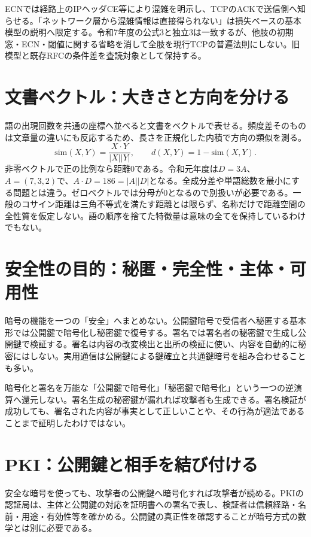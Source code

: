 ECNでは経路上のIPヘッダCE等により混雑を明示し、TCPのACKで送信側へ知らせる\cite{net_ecn2001}。「ネットワーク層から混雑情報は直接得られない」は損失ベースの基本模型の説明へ限定する。令和7年度の公式3と独立3は一致するが、他肢の初期窓・ECN・閾値に関する省略を消して全肢を現行TCPの普遍法則にしない。旧模型と既存RFCの条件差を査読対象として保持する。

\section{文書ベクトル：大きさと方向を分ける}
\label{theory:network:cosine}
語の出現回数を共通の座標へ並べると文書をベクトルで表せる。頻度差そのものは文章量の違いにも反応するため、長さを正規化した内積で方向の類似を測る\cite{net_cosine}。
\[
 \mathrm{sim}(X,Y)=\frac{X\cdot Y}{|X||Y|},\qquad
 d(X,Y)=1-\mathrm{sim}(X,Y).
\]
非零ベクトルで正の比例なら距離0である。令和元年度は$D=3A$、$A=(7,3,2)$で、$A\cdot D=186=|A||D|$となる。全成分差や単語総数を最小にする問題とは違う。ゼロベクトルでは分母が0となるので別扱いが必要である。一般のコサイン距離は三角不等式を満たす距離とは限らず、名称だけで距離空間の全性質を仮定しない。語の順序を捨てた特徴量は意味の全てを保持しているわけでもない。

\section{安全性の目的：秘匿・完全性・主体・可用性}
\label{theory:network:keys}
暗号の機能を一つの「安全」へまとめない。公開鍵暗号で受信者へ秘匿する基本形では公開鍵で暗号化し秘密鍵で復号する。署名では署名者の秘密鍵で生成し公開鍵で検証する。署名は内容の改変検出と出所の検証に使い、内容を自動的に秘密にはしない\cite{net_signature}。実用通信は公開鍵による鍵確立と共通鍵暗号を組み合わせることも多い。

暗号化と署名を万能な「公開鍵で暗号化」「秘密鍵で暗号化」という一つの逆演算へ還元しない。署名生成の秘密鍵が漏れれば攻撃者も生成できる。署名検証が成功しても、署名された内容が事実として正しいことや、その行為が適法であることまで証明したわけではない。

\section{PKI：公開鍵と相手を結び付ける}
\label{theory:network:pki}
安全な暗号を使っても、攻撃者の公開鍵へ暗号化すれば攻撃者が読める。PKIの認証局は、主体と公開鍵の対応を証明書への署名で表し、検証者は信頼経路・名前・用途・有効性等を確かめる\cite{net_pki}。公開鍵の真正性を確認することが暗号方式の数学とは別に必要である。

